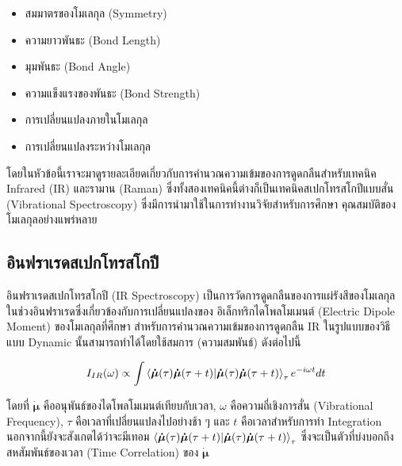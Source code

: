 \begin{itemize}
    \item สมมาตรของโมเลกุล (Symmetry)

    \item ความยาวพันธะ (Bond Length)

    \item มุมพันธะ (Bond Angle)

    \item ความแข็งแรงของพันธะ (Bond Strength)

    \item การเปลี่ยนแปลงภายในโมเลกุล

    \item การเปลี่ยนแปลงระหว่างโมเลกุล
\end{itemize}

โดยในหัวข้อนี้เราจะมาดูรายละเอียดเกี่ยวกับการคำนวณความเข้มของการดูดกลืนสำหรับเทคนิค Infrared (IR) และรามาน (Raman)
ซึ่งทั้งสองเทคนิคนี้ต่างก็เป็นเทคนิคสเปกโทรสโกปีแบบสั่น (Vibrational Spectroscopy) ซึ่งมีการนำมาใช้ในการทำงานวิจัยสำหรับการศึกษา%
คุณสมบัติของโมเลกุลอย่างแพร่หลาย

\subsection{อินฟราเรดสเปกโทรสโกปี}
\label{ssec:ir_spectro}

อินฟราเรดสเปกโทรสโกปี (IR Spectroscopy) เป็นการวัดการดูดกลืนของการแผ่รังสีของโมเลกุลในช่วงอินฟราเรดซึ่งเกี่ยวข้องกับการเปลี่ยนแปลงของ%
อิเล็กทริกไดโพลโมเมนต์ (Electric Dipole Moment) ของโมเลกุลที่ศึกษา สำหรับการคำนวณความเข้มของการดูดกลืน IR ในรูปแบบของวิธีแบบ
Dynamic นั้นสามารถทำได้โดยใช้สมการ (ความสมพันธ์) ดังต่อไปนี้\autocite{thomas2013}

\begin{equation}\label{eq:IR_corr}
    I_{IR} (\omega) \propto \int \braket{\bm{\dot{\mu}}(\tau) \bm{\dot{\mu}}(\tau+t)}_{\tau} e^{-i \omega t} dt
\end{equation}

\noindent โดยที่ $\bm{\dot{\mu}}$ คืออนุพันธ์ของไดโพลโมเมนต์เทียบกับเวลา, $\omega$ คือความถี่เชิงการสั่น (Vibrational Frequency),
$\tau$ คือเวลาที่เปลี่ยนแปลงไปอย่างช้า ๆ และ $t$ คือเวลาสำหรับการทำ Integration นอกจากนี้ยังจะสังเกตได้ว่าจะมีเทอม
$\braket{\bm{\dot{\mu}}(\tau) \bm{\dot{\mu}}(\tau+t)}_{\tau}$ ซึ่งจะเป็นตัวที่บ่งบอกถึงสหสัมพันธ์ของเวลา (Time Correlation)
ของ $\bm{\dot{\mu}}$

